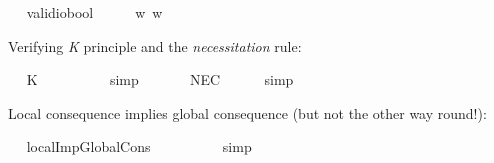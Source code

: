 \begin{isabellebody}
\ \isamarkupfalse%
\ valid{\isacharcolon}{\isacharcolon}{\isachardoublequoteopen}io{\isasymRightarrow}bool{\isachardoublequoteclose}\ {\isacharparenleft}{\isachardoublequoteopen}{\isasymlfloor}{\isacharunderscore}{\isasymrfloor}{\isachardoublequoteclose}{\isacharparenright}\ \ {\isachardoublequoteopen}{\isasymlfloor}{\isasympsi}{\isasymrfloor}\ {\isasymequiv}\ \ {\isasymforall}w{\isachardot}{\isacharparenleft}{\isasympsi}\ w{\isacharparenright}{\isachardoublequoteclose}\ %
%
\begin{isamarkuptext}%
Verifying \emph{K} principle and the \emph{necessitation} rule:%
\end{isamarkuptext}\isamarkuptrue%
\ \isamarkupfalse%
\ K{\isacharcolon}\ {\isachardoublequoteopen}{\isasymlfloor}{\isacharparenleft}\isactrlbold {\isasymbox}{\isacharparenleft}{\isasymphi}\ \isactrlbold {\isasymrightarrow}\ {\isasympsi}{\isacharparenright}{\isacharparenright}\ \isactrlbold {\isasymrightarrow}\ {\isacharparenleft}\isactrlbold {\isasymbox}{\isasymphi}\ \isactrlbold {\isasymrightarrow}\ \isactrlbold {\isasymbox}{\isasympsi}{\isacharparenright}{\isasymrfloor}{\isachardoublequoteclose}%
\ %
%
\isamarkupfalse%
\ simp\ \ \ \ %
%
%
%
\isanewline
\ \isamarkupfalse%
\ NEC{\isacharcolon}\ {\isachardoublequoteopen}{\isasymlfloor}{\isasymphi}{\isasymrfloor}\ {\isasymLongrightarrow}\ {\isasymlfloor}\isactrlbold {\isasymbox}{\isasymphi}{\isasymrfloor}{\isachardoublequoteclose}%
\ %
%
\isamarkupfalse%
\ simp\ \ \ \ %
%
%
%
%
\begin{isamarkuptext}%
Local consequence implies global consequence (but not the other way round!):%
\end{isamarkuptext}\isamarkuptrue%
\ \isamarkupfalse%
\ localImpGlobalCons{\isacharcolon}\ {\isachardoublequoteopen}{\isasymlfloor}{\isasymphi}\ \isactrlbold {\isasymrightarrow}\ {\isasymxi}{\isasymrfloor}\ {\isasymLongrightarrow}\ {\isasymlfloor}{\isasymphi}{\isasymrfloor}\ {\isasymlongrightarrow}\ {\isasymlfloor}{\isasymxi}{\isasymrfloor}{\isachardoublequoteclose}%
\ %
%
\isamarkupfalse%
\ simp%
%
%
\isanewline
\ \isamarkupfalse%
\ {\isachardoublequoteopen}{\isasymlfloor}{\isasymphi}{\isasymrfloor}\ {\isasymlongrightarrow}\ {\isasymlfloor}{\isasymxi}{\isasymrfloor}\ {\isasymLongrightarrow}\ {\isasymlfloor}{\isasymphi}\ \isactrlbold {\isasymrightarrow}\ {\isasymxi}{\isasymrfloor}{\isachardoublequoteclose}\ \isamarkupfalse%

\end{isabellebody}
